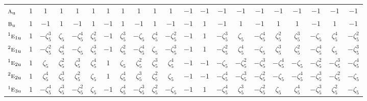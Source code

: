 \documentclass[10pt,a4paper]{article}
\numberwithin{equation}{section}
\newcommand{\irr}[1]{\text{\normalfont\scshape #1}}
\newcommand{\conjpair}[1]{{}^{#1}}
\newcommand{\ptag}[1]{\mathrm{#1}}
\newcommand{\rootunity}[1]{\zeta_{#1}}
\begin{document}
{\begin{longtable}{@{}lcccccccccccccccccccc@{}}
$\irr{a}_{\ptag{u}}$ & $1$ & $1$ & $1$ & $1$ & $1$ & $1$ & $1$ & $1$ & $1$ & $1$ & $-1$ & $-1$ & $-1$ & $-1$ & $-1$ & $-1$ & $-1$ & $-1$ & $-1$ & $-1$\\
$\irr{b}_{\ptag{u}}$ & $1$ & $-1$ & $1$ & $-1$ & $1$ & $-1$ & $1$ & $-1$ & $1$ & $-1$ & $-1$ & $1$ & $-1$ & $1$ & $-1$ & $1$ & $1$ & $-1$ & $1$ & $-1$\\
$\conjpair{1}\irr{e}_{1\ptag{u}}$ & $1$ & $-\rootunity{5}^{3}$ & $\rootunity{5}$ & $-\rootunity{5}^{4}$ & $\rootunity{5}^{2}$ & $-1$ & $\rootunity{5}^{3}$ & $-\rootunity{5}$ & $\rootunity{5}^{4}$ & $-\rootunity{5}^{2}$ & $-1$ & $1$ & $-\rootunity{5}^{3}$ & $\rootunity{5}$ & $-\rootunity{5}^{4}$ & $\rootunity{5}^{2}$ & $\rootunity{5}^{3}$ & $-\rootunity{5}$ & $\rootunity{5}^{4}$ & $-\rootunity{5}^{2}$\\
$\conjpair{2}\irr{e}_{1\ptag{u}}$ & $1$ & $-\rootunity{5}^{2}$ & $\rootunity{5}^{4}$ & $-\rootunity{5}$ & $\rootunity{5}^{3}$ & $-1$ & $\rootunity{5}^{2}$ & $-\rootunity{5}^{4}$ & $\rootunity{5}$ & $-\rootunity{5}^{3}$ & $-1$ & $1$ & $-\rootunity{5}^{2}$ & $\rootunity{5}^{4}$ & $-\rootunity{5}$ & $\rootunity{5}^{3}$ & $\rootunity{5}^{2}$ & $-\rootunity{5}^{4}$ & $\rootunity{5}$ & $-\rootunity{5}^{3}$\\
$\conjpair{1}\irr{e}_{2\ptag{u}}$ & $1$ & $\rootunity{5}$ & $\rootunity{5}^{2}$ & $\rootunity{5}^{3}$ & $\rootunity{5}^{4}$ & $1$ & $\rootunity{5}$ & $\rootunity{5}^{2}$ & $\rootunity{5}^{3}$ & $\rootunity{5}^{4}$ & $-1$ & $-1$ & $-\rootunity{5}$ & $-\rootunity{5}^{2}$ & $-\rootunity{5}^{3}$ & $-\rootunity{5}^{4}$ & $-\rootunity{5}$ & $-\rootunity{5}^{2}$ & $-\rootunity{5}^{3}$ & $-\rootunity{5}^{4}$\\
$\conjpair{2}\irr{e}_{2\ptag{u}}$ & $1$ & $\rootunity{5}^{4}$ & $\rootunity{5}^{3}$ & $\rootunity{5}^{2}$ & $\rootunity{5}$ & $1$ & $\rootunity{5}^{4}$ & $\rootunity{5}^{3}$ & $\rootunity{5}^{2}$ & $\rootunity{5}$ & $-1$ & $-1$ & $-\rootunity{5}^{4}$ & $-\rootunity{5}^{3}$ & $-\rootunity{5}^{2}$ & $-\rootunity{5}$ & $-\rootunity{5}^{4}$ & $-\rootunity{5}^{3}$ & $-\rootunity{5}^{2}$ & $-\rootunity{5}$\\
$\conjpair{1}\irr{e}_{3\ptag{u}}$ & $1$ & $-\rootunity{5}^{4}$ & $\rootunity{5}^{3}$ & $-\rootunity{5}^{2}$ & $\rootunity{5}$ & $-1$ & $\rootunity{5}^{4}$ & $-\rootunity{5}^{3}$ & $\rootunity{5}^{2}$ & $-\rootunity{5}$ & $-1$ & $1$ & $-\rootunity{5}^{4}$ & $\rootunity{5}^{3}$ & $-\rootunity{5}^{2}$ & $\rootunity{5}$ & $\rootunity{5}^{4}$ & $-\rootunity{5}^{3}$ & $\rootunity{5}^{2}$ & $-\rootunity{5}$\\

\end{longtable}}
\end{document}
